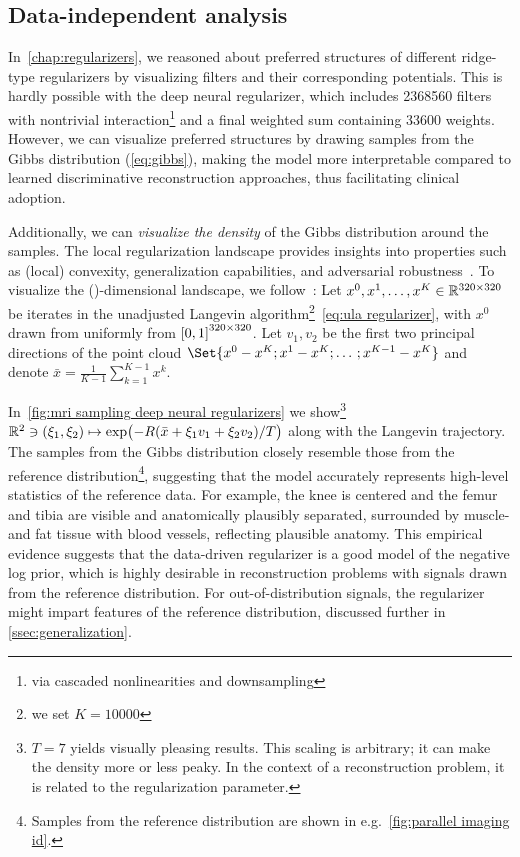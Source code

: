 \subsection{Data-independent analysis}%
\label{ssec:data independent analysis}
In~\cref{chap:regularizers}, we reasoned about preferred structures of different ridge-type regularizers by visualizing filters and their corresponding potentials.
This is hardly possible with the deep neural regularizer, which includes \num{2368560} filters with nontrivial interaction\footnote{via cascaded nonlinearities and downsampling} and a final weighted sum containing \num{33600} weights.
However, we can visualize preferred structures by drawing samples from the Gibbs distribution (\cref{eq:gibbs}), making the model more interpretable compared to learned discriminative reconstruction approaches, thus facilitating clinical adoption.

Additionally, we can \emph{visualize the density} of the Gibbs distribution around the samples.
The local regularization landscape provides insights into properties such as (local) convexity, generalization capabilities, and adversarial robustness~\cite{Stutz_2021_adversarial}.
To visualize the ()-dimensional landscape, we follow~\cite{li_2018_visualizing}:
Let \( x^{\num{0}}, x^{\num{1}},\dotsc, x^K \in \R^{\numproduct{320x320}} \) be iterates in the unadjusted Langevin algorithm\footnote{we set \( K = \num{10000} \)}~\cref{eq:ula regularizer}, with \( x^{\num{0}} \) drawn from uniformly from \( \interval{\num{0}}{\num{1}}^{\numproduct{320x320}} \).
Let \( v_{\num{1}}, v_{\num{2}} \) be the first two principal directions of the point cloud \( \Set{x^{\num{0}} - x^{K};x^{\num{1}} - x^{K};\dotsc;x^{K-\num{1}} - x^{K}} \) and denote \( \bar{x} = \frac{1}{K-1} \sum_{k=\num{1}}^{K-\num{1}} x^{k} \).

In~\cref{fig:mri sampling deep neural regularizers} we show\footnote{%
	\( T = \num{7} \) yields visually pleasing results.
	This scaling is arbitrary; it can make the density more or less peaky.
	In the context of a reconstruction problem, it is related to the regularization parameter.
} \( \mathbb{R}^{\num{2}} \ni (\xi_{\num{1}}, \xi_{\num{2}}) \mapsto \exp \bigl( -R(\bar{x} + \xi_{\num{1}} v_{\num{1}} + \xi_{\num{2}} v_{\num{2}}) / T \bigr) \) along with the Langevin trajectory.
The samples from the Gibbs distribution closely resemble those from the reference distribution\footnote{%
	Samples from the reference distribution are shown in e.g.~\cref{fig:parallel imaging id}.
}, suggesting that the model accurately represents high-level statistics of the reference data.
For example, the knee is centered and the femur and tibia are visible and anatomically plausibly separated, surrounded by muscle- and fat tissue with blood vessels, reflecting plausible anatomy.
This empirical evidence suggests that the data-driven regularizer is a good model of the negative log prior, which is highly desirable in reconstruction problems with signals drawn from the reference distribution.
For out-of-distribution signals, the regularizer might impart features of the reference distribution, discussed further in \cref{ssec:generalization}.

